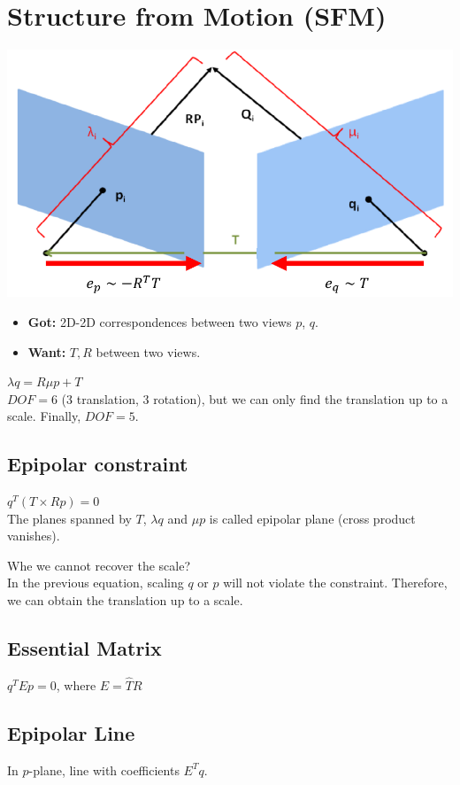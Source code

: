 \section{Structure from Motion (SFM)}
\includegraphics[width=\linewidth]{Images/SFM.png}
\begin{itemize}
  \item \textbf{Got:} 2D-2D correspondences between two views $p$, $q$.
  \item \textbf{Want:} $T, R$ between two views.
\end{itemize}
$\lambda q = R \mu p + T$\\
$DOF = 6$ (3 translation, 3 rotation), but 
we can only find the translation up to a scale. Finally, $DOF = 5$.

\subsection*{Epipolar constraint}
$q^T ( T \times R p) = 0$\\
The planes spanned by $T$, $\lambda q$ and $\mu p$ is called epipolar
plane (cross product vanishes).

\alert{Whe we cannot recover the scale?}\\
In the previous equation, scaling $q$ or $p$ will not violate the
constraint. Therefore, we can obtain the translation up to a scale.

\subsection*{Essential Matrix}
$q^T E p = 0$, where $E = \hat{T} R$

\subsection*{Epipolar Line}
In $p$-plane, line with coefficients $E^T q$.

